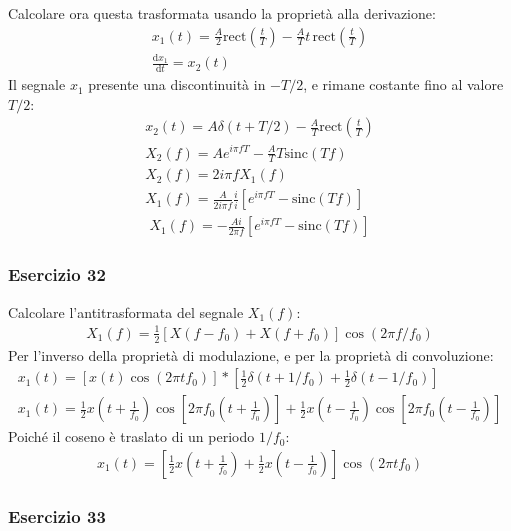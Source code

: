 \documentclass{article}
\newcommand{\rect}{\mathrm{rect}}
\newcommand{\sinc}{\mathrm{sinc}}
\newcommand{\df}{\mathrm{d}}
\begin{document}
Calcolare ora questa trasformata usando la proprietà alla derivazione:
\begin{gather*}
    x_1(t)=\displaystyle\frac{A}{2}\rect\left(\frac{t}{T}\right)-\frac{A}{T}t\,\rect\left(\frac{t}{T}\right)\\
    \displaystyle\frac{\df x_1}{\df t}=x_2(t)
\end{gather*}
Il segnale $x_1$ presente una discontinuità in $-T/2$, e rimane costante fino al valore $T/2$:
\begin{gather*}
    x_2(t)=A\delta(t+T/2)-\displaystyle\frac{A}{T}\rect\left(\frac{t}{T}\right)\\
    X_2(f)=Ae^{i\pi fT}-\displaystyle\frac{A}{T}T\sinc(Tf)\\
    X_2(f)=2i\pi fX_1(f)\\
    X_1(f)=\displaystyle\frac{A}{2i\pi f}\frac{i}{i}\left[e^{i\pi fT}-\sinc(Tf)\right]
\end{gather*}
\begin{gather}
    X_1(f)=\displaystyle-\frac{Ai}{2\pi f}\left[e^{i\pi fT}-\sinc(Tf)\right]
\end{gather}

\subsubsection*{Esercizio 32}

Calcolare l'antitrasformata del segnale $X_1(f)$:
\begin{gather*}
    X_1(f)=\displaystyle\frac{1}{2}\left[X(f-f_0)+X(f+f_0)\right]\cos(2\pi f/f_0)
\end{gather*}
Per l'inverso della proprietà di modulazione, e per la proprietà di convoluzione:
\begin{gather*}
    x_1(t)=\left[x(t)\cos(2\pi tf_0)\right]*\left[\displaystyle\frac{1}{2}\delta(t+1/f_0)+\frac{1}{2}\delta(t-1/f_0)\right]\\
    x_1(t)=\displaystyle\frac{1}{2}x\left(t+\frac{1}{f_0}\right)\cos\left[2\pi f_0\left(t+\frac{1}{f_0}\right)\right]+\frac{1}{2}x\left(t-\frac{1}{f_0}\right)\cos\left[2\pi f_0\left(t-\frac{1}{f_0}\right)\right]
\end{gather*}
Poiché il coseno è traslato di un periodo $1/f_0$: 
\begin{gather}
    x_1(t)=\left[\displaystyle\frac{1}{2}x\left(t+\frac{1}{f_0}\right)+\frac{1}{2}x\left(t-\frac{1}{f_0}\right)\right]\cos(2\pi tf_0)
\end{gather}

\subsubsection*{Esercizio 33}
\end{document}
